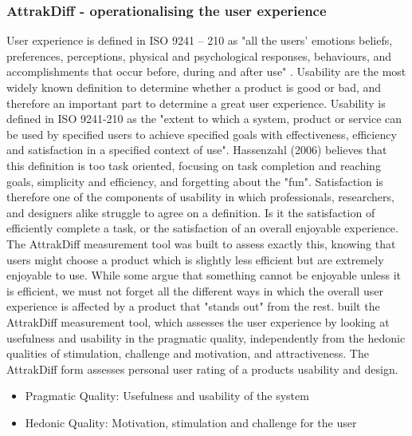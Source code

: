     \vspace{5mm} %
   
    \subsubsection{AttrakDiff - operationalising the user experience}
    
    User experience is defined in ISO 9241 – 210 as "all the users' emotions beliefs, preferences, perceptions, physical and psychological responses, behaviours, and accomplishments that occur before, during and after use" \citep{ISO9241-210}. Usability are the most widely known definition to determine whether a product is good or bad, and therefore an important part to determine a great user experience. Usability is defined in ISO 9241-210 as the "extent to which a system, product or service can be used by specified users to achieve specified goals with effectiveness, efficiency and satisfaction in a specified context of use". Hassenzahl (2006) believes that this definition is too task oriented, focusing on task completion and reaching goals, simplicity and efficiency, and forgetting about the "fun". Satisfaction is therefore one of the components of usability in which professionals, researchers, and designers alike struggle to agree on a definition. Is it the satisfaction of efficiently complete a task, or the satisfaction of an overall enjoyable experience. The AttrakDiff measurement tool was built to assess exactly this, knowing that users might choose a product which is slightly less efficient but are extremely enjoyable to use. While some argue that something cannot be enjoyable unless it is efficient, we must not forget all the different ways in which the overall user experience is affected by a product that "stands out" from the rest. \cite{Hassenzahl2000} built the AttrakDiff measurement tool, which assesses the user experience by looking at usefulness and usability in the pragmatic quality, independently from the hedonic qualities of stimulation, challenge and motivation, and attractiveness. The AttrakDiff form assesses personal user rating of a products usability and design.
    
     \begin{itemize}
        \item Pragmatic Quality: Usefulness and usability of the system
        \item Hedonic Quality: Motivation, stimulation and challenge for the user
    \end{itemize}
    
